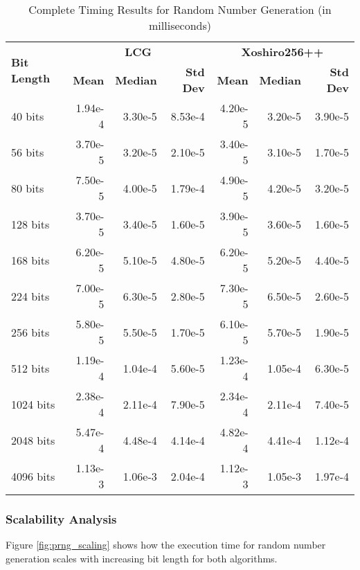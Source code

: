 \begin{table}[H]
\centering
\caption{Complete Timing Results for Random Number Generation (in milliseconds)}
\label{tab:prng_complete}
\begin{tabular}{@{}lrrrrrr@{}}
\toprule
\multirow{2}{*}{\textbf{Bit Length}} & \multicolumn{3}{c}{\textbf{LCG}} & \multicolumn{3}{c}{\textbf{Xoshiro256++}} \\
\cmidrule(lr){2-4} \cmidrule(lr){5-7}
& \textbf{Mean} & \textbf{Median} & \textbf{Std Dev} & \textbf{Mean} & \textbf{Median} & \textbf{Std Dev} \\
\midrule
40 bits     & 1.94e-4 & 3.30e-5 & 8.53e-4 & 4.20e-5 & 3.20e-5 & 3.90e-5 \\
56 bits     & 3.70e-5 & 3.20e-5 & 2.10e-5 & 3.40e-5 & 3.10e-5 & 1.70e-5 \\
80 bits     & 7.50e-5 & 4.00e-5 & 1.79e-4 & 4.90e-5 & 4.20e-5 & 3.20e-5 \\
128 bits    & 3.70e-5 & 3.40e-5 & 1.60e-5 & 3.90e-5 & 3.60e-5 & 1.60e-5 \\
168 bits    & 6.20e-5 & 5.10e-5 & 4.80e-5 & 6.20e-5 & 5.20e-5 & 4.40e-5 \\
224 bits    & 7.00e-5 & 6.30e-5 & 2.80e-5 & 7.30e-5 & 6.50e-5 & 2.60e-5 \\
256 bits    & 5.80e-5 & 5.50e-5 & 1.70e-5 & 6.10e-5 & 5.70e-5 & 1.90e-5 \\
512 bits    & 1.19e-4 & 1.04e-4 & 5.60e-5 & 1.23e-4 & 1.05e-4 & 6.30e-5 \\
1024 bits   & 2.38e-4 & 2.11e-4 & 7.90e-5 & 2.34e-4 & 2.11e-4 & 7.40e-5 \\
2048 bits   & 5.47e-4 & 4.48e-4 & 4.14e-4 & 4.82e-4 & 4.41e-4 & 1.12e-4 \\
4096 bits   & 1.13e-3 & 1.06e-3 & 2.04e-4 & 1.12e-3 & 1.05e-3 & 1.97e-4 \\
\bottomrule
\end{tabular}
\end{table}

\subsubsection{Scalability Analysis}

Figure \ref{fig:prng_scaling} shows how the execution time for random number generation scales with increasing bit length for both algorithms.

